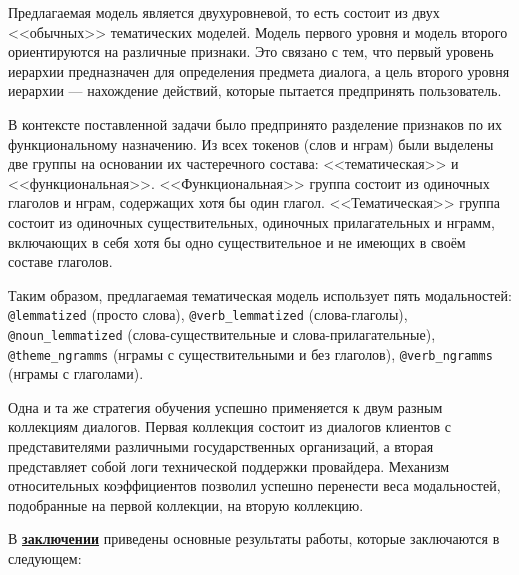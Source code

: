 
Предлагаемая модель является двухуровневой, то есть состоит из двух <<обычных>> тематических моделей. Модель первого уровня и модель второго ориентируются на различные признаки. Это связано с тем, что первый уровень иерархии предназначен для определения предмета диалога, а цель второго уровня иерархии --- нахождение действий, которые пытается предпринять пользователь. %

В контексте поставленной задачи было предпринято разделение признаков по их функциональному назначению. Из всех токенов (слов и нграм) были выделены две группы на основании их частеречного состава: <<тематическая>> и <<функциональная>>. <<Функциональная>> группа состоит из одиночных глаголов и нграм, содержащих хотя бы один глагол. <<Тематическая>> группа состоит из одиночных существительных, одиночных прилагательных и нграмм, включающих в себя хотя бы одно существительное и не имеющих в своём составе глаголов.

Таким образом, предлагаемая тематическая модель использует пять модальностей: \texttt{@lemmatized} (просто слова), \texttt{@verb\_lemmatized} (слова-глаголы), \texttt{@noun\_lemmatized} (слова-существительные и слова-прилагательные), \texttt{@theme\_ngramms} (нграмы с существительными и без глаголов), \texttt{@verb\_ngramms} (нграмы с глаголами).



Одна и та же стратегия обучения успешно применяется к двум разным коллекциям диалогов. Первая коллекция состоит из диалогов клиентов с представителями различными государственных организаций, а вторая представляет собой логи технической поддержки провайдера. Механизм относительных коэффициентов позволил успешно перенести веса модальностей, подобранные на первой коллекции, на вторую коллекцию.


\FloatBarrier
{}                                  %
В \underline{\textbf{заключении}} приведены основные результаты работы, которые заключаются в следующем:



